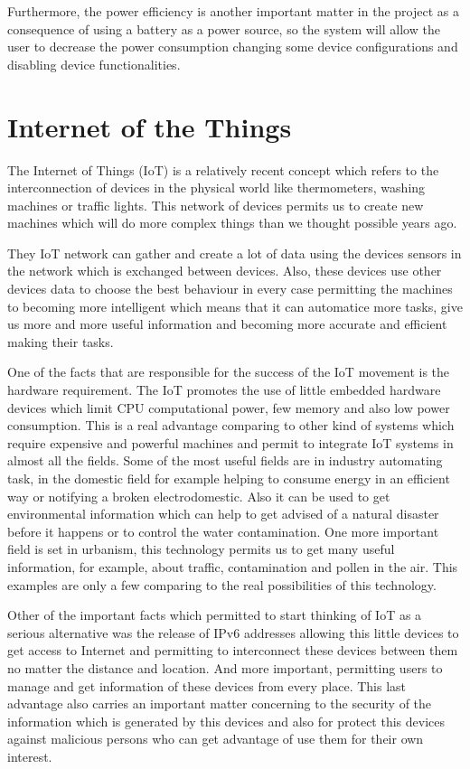 	Furthermore, the power efficiency is another important matter in the project as a consequence of using a battery as a power source, so the system will allow the user to decrease the power consumption changing some device configurations and disabling device functionalities.

	\section{Internet of the Things}

	The Internet of Things (IoT) is a relatively recent concept which refers to the interconnection of devices in the physical world like thermometers, washing machines or traffic lights. This network of devices permits us to create new machines which will do more complex things than we thought possible years ago.

	They IoT network can gather and create a lot of data using the devices sensors in the network which is exchanged between devices. Also, these devices use other devices data to choose the best behaviour in every case permitting the machines to becoming more intelligent which means that it can automatice more tasks, give us more and more useful information and becoming more accurate and efficient making their tasks.

	One of the facts that are responsible for the success of the IoT movement is the hardware requirement. The IoT promotes the use of little embedded hardware devices which limit CPU computational power, few memory and also low power consumption. This is a real advantage comparing to other kind of systems which require expensive and powerful machines and permit to integrate IoT systems in almost all the fields. Some of the most useful fields are in industry automating task, in the domestic field for example helping to consume energy in an efficient way or notifying a broken electrodomestic. Also it can be used to get environmental information which can help to get advised of a natural disaster before it happens or to control the water contamination. One more important field is set in urbanism, this technology permits us to get many useful information, for example, about traffic, contamination and pollen in the air. This examples are only a few comparing to the real possibilities of this technology. 

	Other of the important facts which permitted to start thinking of IoT as a serious alternative was the release of IPv6 addresses allowing this little devices to get access to Internet and permitting to interconnect these devices between them no matter the distance and location. And more important, permitting users to manage and get information of these devices from every place. This last advantage also carries an important matter concerning to the security of the information which is generated by this devices and also for protect this devices against malicious persons who can get advantage of use them for their own interest.

